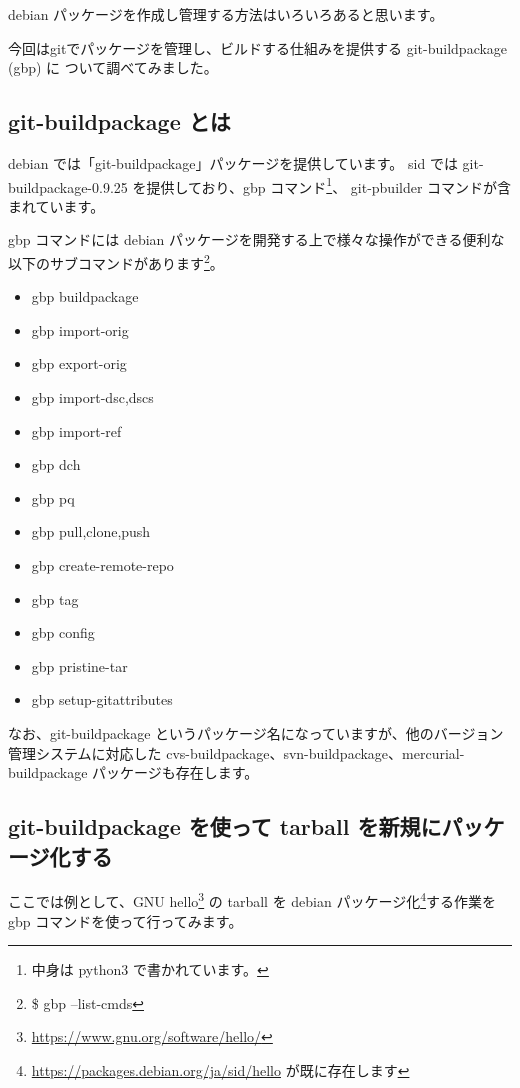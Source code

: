 \documentclass[mingoth,a4paper]{jsarticle}
\begin{document}
debian パッケージを作成し管理する方法はいろいろあると思います。

今回はgitでパッケージを管理し、ビルドする仕組みを提供する git-buildpackage (gbp) に
ついて調べてみました。

\subsection{git-buildpackage とは}

debian では「git-buildpackage」パッケージを提供しています。
sid では git-buildpackage-0.9.25 を提供しており、gbp コマンド\footnote{中身は python3 で書かれています。}、
git-pbuilder コマンドが含まれています。

gbp コマンドには debian パッケージを開発する上で様々な操作ができる便利な以下のサブコマンドがあります\footnote{\$ gbp --list-cmds}。

\begin{itemize}
  \item	gbp buildpackage
  \item gbp import-orig
  \item gbp export-orig
  \item gbp import-{dsc,dscs}
  \item gbp import-ref
  \item gbp dch
  \item gbp pq
  \item gbp {pull,clone,push}
  \item gbp create-remote-repo
  \item gbp tag
  \item gbp config
  \item gbp pristine-tar
  \item gbp setup-gitattributes
\end{itemize}

なお、git-buildpackage というパッケージ名になっていますが、他のバージョン管理システムに対応した cvs-buildpackage、svn-buildpackage、mercurial-buildpackage パッケージも存在します。


\subsection{git-buildpackage を使って tarball を新規にパッケージ化する}

ここでは例として、GNU hello\footnote{\url{https://www.gnu.org/software/hello/}} の tarball を debian パッケージ化\footnote{\url{https://packages.debian.org/ja/sid/hello} が既に存在します}する作業を gbp コマンドを使って行ってみます。
\end{document}
